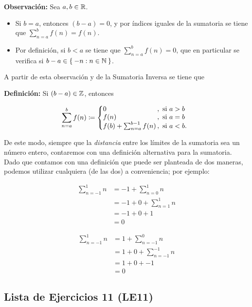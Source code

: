     \textbf{Observación:} Sea $a,b\in \mathbb{R}$.
    \begin{itemize}
      \item Si $b=a$, entonces $(b-a)=0$, y por índices iguales de la sumatoria se tiene que $\sum_{n=a}^{b} f(n) = f(n)$.
      \item Por definición, si $b<a$ se tiene que $\sum_{n=a}^{b} f(n) =0$, que en particular se verifica si $b-a\in \Set{-n:n\in \mathbb{N}}$.
    \end{itemize}
    A partir de esta observación y de la Sumatoria Inversa se tiene que

    \textbf{Definición:} Si $(b-a)\in \mathbb{Z}$, entonces

    \[\sum_{n=a}^{b} f(n) \defined \left\{
    \begin{array}{@{}l@{\thinspace}l}
      0 &,  \ \text{si}  \ a>b\\
      f(n) &,  \ \text{si}  \ a=b\\
      f(b) + \sum_{n=a}^{b-1} f(n) &,  \ \text{si}  \ a<b.
    \end{array} \right. \]

    De este modo, siempre que la \textit{distancia} entre los límites de la sumatoria sea un número entero, contaremos con una definición alternativa para la sumatoria. Dado que contamos con una definición que puede ser planteada de dos maneras, podemos utilizar cualquiera (de las dos) a conveniencia; por ejemplo:
\begin{center}
  \begin{minipage}[c]{.5\linewidth}
    \begin{align*}
      \sum_{n=-1}^{1} n &= -1 + \sum_{n=0}^{1} n\\
      &= -1 + 0 + \sum_{n=1}^1 n\\
      &= -1 + 0 + 1\\
      &= 0
    \end{align*}
   \end{minipage}%
  \begin{minipage}[c]{.5\linewidth}
    \begin{align*}
      \sum_{n=-1}^{1} n &= 1 + \sum_{n=-1}^{0} n\\
      &= 1 + 0 + \sum_{n=-1}^{-1} n\\
      &= 1 + 0 + -1\\
      &= 0
    \end{align*}
  \end{minipage}
  \end{center}

\subsection*{Lista de Ejercicios 11 (LE11)}

